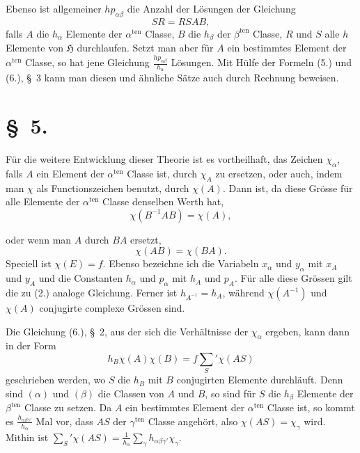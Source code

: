 \documentclass[11pt]{article}
\newcommand{\grp}{\mathfrak{H}}
\begin{document}
Ebenso ist allgemeiner $hp_{\alpha\beta}$ die Anzahl der Lösungen der Gleichung
\begin{equation*}\tag{14.}
SR=RSAB,
\end{equation*}
falls $A$ die $h_\alpha$ Elemente der $\alpha^{\text{ten}}$ Classe, $B$ die $h_\beta$ der $\beta^{\text{ten}}$ Classe, $R$ und $S$ alle $h$ Elemente von $\grp$ durchlaufen. Setzt man aber für $A$ ein bestimmtes Element der $\alpha^{\text{ten}}$ Classe, so hat jene Gleichung $\frac{hp_{\alpha\beta}}{h_\alpha}$ Lösungen. Mit Hülfe der Formeln (5.) und (6.), \S~3 kann man diesen und ähnliche Sätze auch durch Rechnung beweisen.

\section*{\S~5.}

Für die weitere Entwicklung dieser Theorie ist es vortheilhaft, das Zeichen $\chi_\alpha$, falls $A$ ein Element der $\alpha^{\text{ten}}$ Classe ist, durch $\chi_A$ zu ersetzen, oder auch, indem man $\chi$ als Functionszeichen benutzt, durch $\chi(A)$. Dann ist, da diese Grösse für alle Elemente der $\alpha^{\text{ten}}$ Classe denselben Werth hat,
\begin{equation*}\tag{1.}
\chi(B^{-1}AB)=\chi(A),
\end{equation*}


oder wenn man $A$ durch $BA$ ersetzt,
\begin{equation*}\tag{2.}
\chi(AB)=\chi(BA).
\end{equation*}
Speciell ist $\chi(E)=f$. Ebenso bezeichne ich die Variabeln $x_\alpha$ und $y_\alpha$ mit $x_A$ und $y_A$ und die Constanten $h_\alpha$ und $p_\alpha$ mit $h_A$ und $p_A$. Für alle diese Grössen gilt die zu (2.) analoge Gleichung. Ferner ist $h_{A^{-1}}=h_A$, während $\chi(A^{-1})$ und $\chi(A)$ conjugirte complexe Grössen sind.

Die Gleichung (6.), \S~2, aus der sich die Verhältnisse der $\chi_\alpha$ ergeben, kann dann in der Form
\begin{equation*}\tag{3.}
h_B\chi(A)\chi(B)=f\sum_S'\chi(AS)
\end{equation*}
geschrieben werden, wo $S$ die $h_B$ mit $B$ conjugirten Elemente durchläuft. Denn sind $(\alpha)$ und $(\beta)$ die Classen von $A$ und $B$, so sind für $S$ die $h_\beta$ Elemente der $\beta^{\text{ten}}$ Classe zu setzen. Da $A$ ein bestimmtes Element der $\alpha^{\text{ten}}$ Classe ist, so kommt es $\frac{h_{\alpha\beta\gamma'}}{h_\alpha}$ Mal vor, dass $AS$ der $\gamma^{\text{ten}}$ Classe angehört, also $\chi(AS)=\chi_\gamma$ wird. Mithin ist $\sum_S'\chi(AS)=\frac{1}{h_\alpha}\sum_\gamma h_{\alpha\beta\gamma'}\chi_\gamma$.
\end{document}
